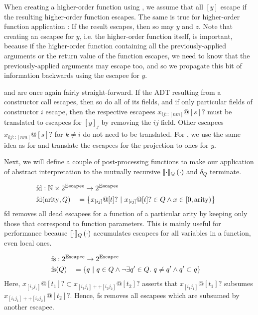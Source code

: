 When creating a higher-order function using , we assume that all $[y]$ escape if the resulting higher-order function escapes. The same is true for higher-order function application : If the result escapes, then so may $y$ and $z$. Note that creating an escapee for $y$, i.e. the higher-order function itself, is important, because if the higher-order function containing all the previously-applied arguments or the return value of the function escapes, we need to know that the previously-applied arguments may escape too, and so we propagate this bit of information backwards using the escapee for $y$.

 and  are once again fairly straight-forward. If the ADT resulting from a constructor call escapes, then so do all of its fields, and if only particular fields of constructor $i$ escape, then the respective escapees $x_{ij :: [nm]} @ [s]?$ must be translated to escapees for $[y]_j$ by removing the $ij$ field. Other escapees $x_{kj :: [nm]} @ [s]?$ for $k \neq i$ do not need to be translated.
For , we use the same idea as for  and translate the escapees for the projection to ones for $y$.

Next, we will define a couple of post-processing functions to make our application of abstract interpretation to the mutually recursive $\llbracket {\cdot} \rrbracket_Q \left( {\cdot} \right)$ and $\delta_Q$ terminate. 

\newcommand{\fd}{\mathrm{fd}}
\newcommand{\ct}{\mathrm{ct}}
\newcommand{\fs}{\mathrm{fs}}

\newcommand{\collapse}{\mathrm{collapse}}

\begin{alignat*}{3}
	\fd &: \mathrlap{\mathbb{N} \times 2^{\Escapee} \to 2^{\Escapee}} \\
	\fd&(\mathrm{arity}, Q) &&= \left\{x_{[ij]}@[t]? \ |\ x_{[ij]}@[t]? \in Q \land x \in [0, \mathrm{arity}) \right\}
\end{alignat*}
fd removes all dead escapees for a function of a particular arity by keeping only those that correspond to function parameters. This is mainly useful for performance because $\llbracket {\cdot} \rrbracket_Q \left( {\cdot} \right)$ accumulates escapees for all variables in a function, even local ones.

\begin{alignat*}{3}
	\fs &: \mathrlap{2^{\Escapee} \to 2^{\Escapee}} \\
	\fs&(Q) &&= \left\{q \ |\ q \in Q \land \lnot \exists q' \in Q.\ q \neq q' \land q' \subset q\right\}
\end{alignat*}
Here, $x_{[i_1j_1]} @ [t_1]? \subset x_{[i_1j_1]++[i_2j_2]} @ [t_2]?$ asserts that $x_{[i_1j_1]} @ [t_1]?$ subsumes $x_{[i_1j_1]++[i_2j_2]} @ [t_2]?$. Hence, fs removes all escapees which are subsumed by another escapee.

